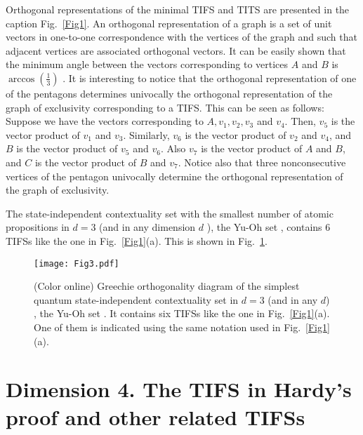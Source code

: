 \documentclass[%
 twocolumn,
 groupedaddress,
 showpacs,
 showkeys,
 preprintnumbers,
 amsmath,amssymb,
 aps,
 pra,
 longbibliography,
 floatfix,
 ]{revtex4-1}
\begin{document}

Orthogonal representations of the minimal TIFS and TITS are presented in the caption Fig.~\ref{Fig1}. An orthogonal representation of a graph is a set of unit vectors in one-to-one correspondence with the vertices of the graph and such that adjacent vertices are associated orthogonal vectors. It can be easily shown that the minimum angle between the vectors corresponding to vertices $A$ and $B$ is $\arccos\left(\frac{1}{3}\right)$ \cite{Cabello94,Cabello96}. It is interesting to notice that the orthogonal representation of one of the pentagons determines univocally the orthogonal representation of the graph of exclusivity corresponding to a TIFS. This can be seen as follows: Suppose we have the vectors corresponding to $A,v_1,v_2,v_3$ and $v_4$. Then, $v_5$ is the vector product of 
$v_1$ and $v_3$. Similarly, $v_6$ is the vector product of 
$v_2$ and $v_4$, and $B$ is the vector product of 
$v_5$ and $v_6$. Also $v_7$ is the vector product of 
$A$ and $B$, and $C$ is the vector product of 
$B$ and $v_7$. Notice also that three nonconsecutive vertices of the pentagon univocally determine the orthogonal representation of the graph of exclusivity.

The state-independent contextuality set with the smallest number of atomic propositions in $d=3$ (and in any dimension $d$ \cite{CKP16}), the Yu-Oh set \cite{YO12}, contains 6 TIFSs like the one in Fig.~\ref{Fig1}(a). This is shown in Fig.~\ref{FigYuOh}.


\begin{figure}
	\centerline{\texttt{[image: Fig3.pdf]}}
	\caption{\label{FigYuOh} (Color online) Greechie orthogonality diagram of the simplest quantum state-independent contextuality set in $d=3$ (and in any $d$) \cite{CKP16}, the Yu-Oh set \cite{YO12}. It contains six TIFSs like the one in Fig.\ \ref{Fig1}(a). One of them is indicated using the same notation used in Fig.\ \ref{Fig1}(a).}
\end{figure}


\section{Dimension 4. The TIFS in Hardy's proof and other related TIFSs}
\end{document}
